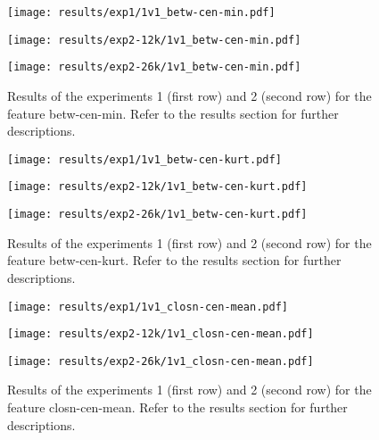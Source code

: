 \begin{figure}[h!]
    \centering
	\begin{minipage}{0.3\linewidth}
		\texttt{[image: results/exp1/1v1\_betw-cen-min.pdf]}
	\end{minipage}

	\begin{minipage}{0.3\linewidth}
		\texttt{[image: results/exp2-12k/1v1\_betw-cen-min.pdf]}
	\end{minipage}
	\begin{minipage}{0.3\linewidth}
		\texttt{[image: results/exp2-26k/1v1\_betw-cen-min.pdf]}
	\end{minipage}

	\caption[ Results: Feature betw-cen-min]{ Results of the experiments 1 (first row) and 2 (second row) for the feature betw-cen-min. Refer to the results section for further descriptions. }
	\label{fig:appendix_betw-cen-min}
\end{figure}
 \newpage 

 
\begin{figure}[h!]
    \centering
	\begin{minipage}{0.3\linewidth}
		\texttt{[image: results/exp1/1v1\_betw-cen-kurt.pdf]}
	\end{minipage}

	\begin{minipage}{0.3\linewidth}
		\texttt{[image: results/exp2-12k/1v1\_betw-cen-kurt.pdf]}
	\end{minipage}
	\begin{minipage}{0.3\linewidth}
		\texttt{[image: results/exp2-26k/1v1\_betw-cen-kurt.pdf]}
	\end{minipage}

	\caption[ Results: Feature betw-cen-kurt]{ Results of the experiments 1 (first row) and 2 (second row) for the feature betw-cen-kurt. Refer to the results section for further descriptions. }
	\label{fig:appendix_betw-cen-kurt}
\end{figure}
 
\begin{figure}[h!]
    \centering
	\begin{minipage}{0.3\linewidth}
		\texttt{[image: results/exp1/1v1\_closn-cen-mean.pdf]}
	\end{minipage}

	\begin{minipage}{0.3\linewidth}
		\texttt{[image: results/exp2-12k/1v1\_closn-cen-mean.pdf]}
	\end{minipage}
	\begin{minipage}{0.3\linewidth}
		\texttt{[image: results/exp2-26k/1v1\_closn-cen-mean.pdf]}
	\end{minipage}

	\caption[ Results: Feature closn-cen-mean]{ Results of the experiments 1 (first row) and 2 (second row) for the feature closn-cen-mean. Refer to the results section for further descriptions. }
	\label{fig:appendix_closn-cen-mean}
\end{figure}
 \newpage 

